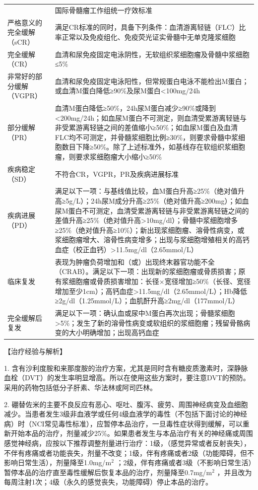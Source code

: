\begin{longtable}[]{@{}ll@{}}
\toprule
\endhead
& 国际骨髓瘤工作组统一疗效标准\tabularnewline
严格意义的完全缓解（sCR） &
满足CR标准的同时，具备下列条件：血清游离轻链（FLC）比率正常以及免疫组化、免疫荧光证实骨髓中无单克隆浆细胞\tabularnewline
完全缓解（CR） &
血清和尿免疫固定电泳阴性，无软组织浆细胞瘤及骨髓中浆细胞≤5\%\tabularnewline
非常好的部分缓解（VGPR） &
血清和尿免疫固定电泳阳性，但常规蛋白电泳不能检出M蛋白；或血清M蛋白降低≥90\%及尿M蛋白<100mg/24h\tabularnewline
部分缓解（PR） &
血清M蛋白降低≥50\%，24h尿M蛋白减少≥90\%或降到<200mg/24h；如血尿M蛋白不可测定，则血清受累游离轻链与非受累游离轻链之间的差值缩小≥50\%；如血尿M蛋白及血清FLC均不可测定，并骨髓浆细胞比例≥30\%，则要求骨髓中浆细胞数目下降≥50\%。除了上述标准外，如基线存在软组织浆细胞瘤，则要求浆细胞瘤大小缩小≥50\%\tabularnewline
疾病稳定（SD） & 不符合CR，VGPR，PR及疾病进展标准\tabularnewline
疾病进展（PD） &
满足以下一项：与基线值比较，血M蛋白升高≥25\%（绝对值升高≥5g/L）；24h尿M成分升高≥25\%（绝对值升高≥200mg）；如血尿M蛋白不可测定，血清受累游离轻链与非受累游离轻链之间的差值升高≥25\%（绝对值升高\textgreater{}10mg/dl）；骨髓中浆细胞增多≥25\%（绝对值升高≥10\%）；新出现浆细胞瘤、溶骨性病变，或浆细胞瘤增大、溶骨性病变增多；出现与浆细胞增殖相关的高钙血症（校正血钙）\textgreater{}11.5mg/dl（2.65mmol/L）\tabularnewline
临床复发 &
表现为肿瘤负荷增加和（或）出现终末器官功能不全（CRAB）。满足以下一项：出现新的浆细胞瘤或骨质损害；原有浆细胞瘤或骨质损害增加：长径×宽径增加≥50\%（长径、宽径增加至少1cm）；高钙血症\textgreater{}11.5mg/dl（2.65mmol/L）；Hb降低≥2g/dl（1.25mmol/L）；血肌酐升高≥2mg/dl（177mmol/L）\tabularnewline
完全缓解后复发 &
满足以下一项：确认血或尿中M蛋白再次出现；骨髓浆细胞\textgreater{}5\%；发生了新的溶骨性病变或软组织的浆细胞瘤；残留骨骼病变的大小明确增加；出现高钙血症\tabularnewline
\bottomrule
\end{longtable}

【治疗经验与解析】

1.
含有沙利度胺和来那度胺的治疗方案，尤其是同时含有糖皮质激素时，深静脉血栓（DVT）的发生率明显增高。所以在使用这些方案时，要注意DVT的预防。采用的药物包括低分子肝素、华法林或阿司匹林。

2.
硼替佐米的主要不良反应有恶心、呕吐、腹泻、疲劳、周围神经病变及血细胞减少。当患者发生3级非血液学或任何4级血液学的毒性（不包括下面讨论的神经病）时（NCI常见毒性标准），应暂停本品治疗，一旦毒性症状得到缓解，可以重新开始本品的治疗，剂量减少25\%。如果患者发生与本品治疗有关的神经痛或周围感觉神经病，应按以下推荐调整剂量进行治疗：1级，（感觉异常或者反射丧失），不伴有疼痛或者功能丧失，剂量不改变；1级，伴有疼痛或者2级（功能障碍，但不影响日常生活），剂量降至1.0mg/m$^2$
；2级，伴有疼痛或者3级（不影响日常生活）暂停本品的治疗直至毒性缓解后恢复本品的治疗，剂量降至0.7mg/m$^2$
，并且改为每周注射1次；4级（永久的感觉丧失，功能障碍）停止本品的治疗。

